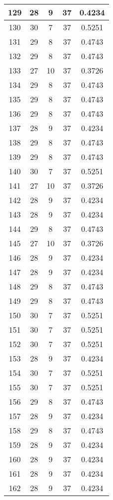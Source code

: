 \documentclass[letterpaper, 12pt]{article}
\begin{document}
\begin{longtable}{|c|c|c|c|c|}
\hline
129 & 28 & 9 & 37 & 0.4234 \\
\hline
130 & 30 & 7 & 37 & 0.5251 \\
\hline
131 & 29 & 8 & 37 & 0.4743 \\
\hline
132 & 29 & 8 & 37 & 0.4743 \\
\hline
133 & 27 & 10 & 37 & 0.3726 \\
\hline
134 & 29 & 8 & 37 & 0.4743 \\
\hline
135 & 29 & 8 & 37 & 0.4743 \\
\hline
136 & 29 & 8 & 37 & 0.4743 \\
\hline
137 & 28 & 9 & 37 & 0.4234 \\
\hline
138 & 29 & 8 & 37 & 0.4743 \\
\hline
139 & 29 & 8 & 37 & 0.4743 \\
\hline
140 & 30 & 7 & 37 & 0.5251 \\
\hline
141 & 27 & 10 & 37 & 0.3726 \\
\hline
142 & 28 & 9 & 37 & 0.4234 \\
\hline
143 & 28 & 9 & 37 & 0.4234 \\
\hline
144 & 29 & 8 & 37 & 0.4743 \\
\hline
145 & 27 & 10 & 37 & 0.3726 \\
\hline
146 & 28 & 9 & 37 & 0.4234 \\
\hline
147 & 28 & 9 & 37 & 0.4234 \\
\hline
148 & 29 & 8 & 37 & 0.4743 \\
\hline
149 & 29 & 8 & 37 & 0.4743 \\
\hline
150 & 30 & 7 & 37 & 0.5251 \\
\hline
151 & 30 & 7 & 37 & 0.5251 \\
\hline
152 & 30 & 7 & 37 & 0.5251 \\
\hline
153 & 28 & 9 & 37 & 0.4234 \\
\hline
154 & 30 & 7 & 37 & 0.5251 \\
\hline
155 & 30 & 7 & 37 & 0.5251 \\
\hline
156 & 29 & 8 & 37 & 0.4743 \\
\hline
157 & 28 & 9 & 37 & 0.4234 \\
\hline
158 & 29 & 8 & 37 & 0.4743 \\
\hline
159 & 28 & 9 & 37 & 0.4234 \\
\hline
160 & 28 & 9 & 37 & 0.4234 \\
\hline
161 & 28 & 9 & 37 & 0.4234 \\
\hline
162 & 28 & 9 & 37 & 0.4234 \\

\end{longtable}
\end{document}
